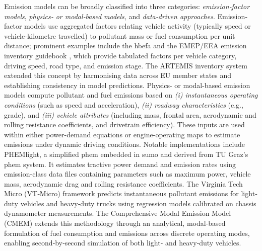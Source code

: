 Emission models can be broadly classified into three categories: \emph{emission‐factor models}, \emph{physics‐ or modal‐based models}, and \emph{data‐driven approaches}. Emission‐factor models use aggregated factors relating vehicle activity (typically speed or vehicle‐kilometre travelled) to pollutant mass or fuel consumption per unit distance; prominent examples include the \ac{hbefa} \cite{HBEFA2023} and the EMEP/EEA emission inventory guidebook \cite{EMEP_EEA2023}, which provide tabulated factors per vehicle category, driving speed, road type, and emission stage. The ARTEMIS inventory system extended this concept by harmonising data across EU member states and establishing consistency in model predictions. \cite{BoulterMcCrae2007}
\mynewline
Physics- or modal-based emission models compute pollutant and fuel emissions based on \emph{(i) instantaneous operating conditions} (such as speed and acceleration), \emph{(ii) roadway characteristics} (e.g., grade), and \emph{(iii) vehicle attributes} (including mass, frontal area, aerodynamic and rolling resistance coefficients, and drivetrain efficiency). These inputs are used within either power-demand equations or engine-operating maps to estimate emissions under dynamic driving conditions. Notable implementations include PHEMlight, a simplified \ac{phem} embedded in \ac{sumo} and derived from TU Graz’s \ac{phem} system. It estimates tractive power demand and emission rates using emission-class data files containing parameters such as maximum power, vehicle mass, aerodynamic drag and rolling resistance coefficients. \cite{SUMOPHEMlight} The Virginia Tech Micro (VT‐Micro) framework predicts instantaneous pollutant emissions for light‐duty vehicles and heavy‐duty trucks using regression models calibrated on chassis dynamometer measurements. \cite{Rakha2004}  
The Comprehensive Modal Emission Model (CMEM) extends this methodology through an analytical, modal‐based formulation of fuel consumption and emissions across discrete operating modes, enabling second‐by‐second simulation of both light‐ and heavy‐duty vehicles. \cite{CMEM_UCR}
\mynewline
